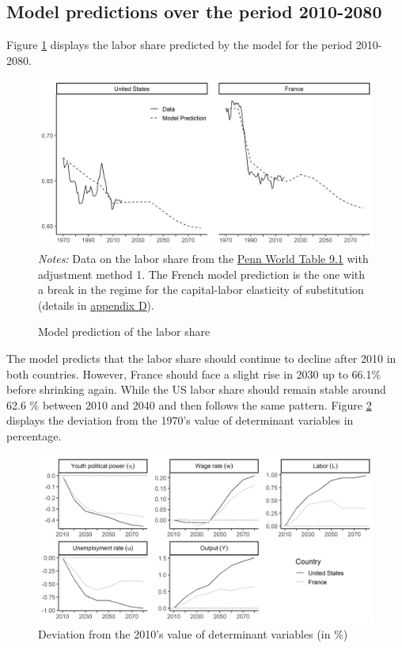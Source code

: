 \subsection{Model predictions over the period 2010-2080}
Figure \ref{fig:baseline1080} displays the labor share predicted by the model for the period 2010-2080.
\begin{figure}[!b]
	\centering
	\caption{Model prediction of the labor share} \label{fig:baseline1080}
	\includegraphics[width=1\linewidth]{../result/baseline7080.png}
	\vspace{-6ex}
	\justify\singlespacing\footnotesize \textit{Notes:} Data on the labor share from the \href{https://www.rug.nl/ggdc/productivity/pwt/}{Penn World Table 9.1} with adjustment method 1. The French model prediction is the one with a break in the regime for the capital-labor elasticity of substitution (details in \hyperref[appendix:regime]{appendix D}).
\end{figure}
The model predicts that the labor share should continue to decline after 2010 in both countries. However, France should face a slight rise in 2030 up to 66.1\% before shrinking again. While the US labor share should remain stable around 62.6 \% between 2010 and 2040 and then follows the same pattern.
Figure \ref{fig:dev_multiple1080} displays the deviation from the 1970's value of determinant variables in percentage. 
\begin{figure}[tb]
	\centering
	\caption{Deviation from the 2010's value of determinant variables (in \%)} \label{fig:dev_multiple1080}
	\includegraphics[width=1\linewidth]{../result/deviation/dev_multiple1080.png}
\end{figure}


